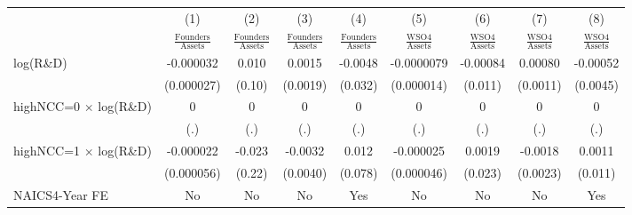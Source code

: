 {
\def\sym#1{\ifmmode^{#1}\else\(^{#1}\)\fi}
\begin{tabular}{l*{8}{c}}
\toprule
                    &\multicolumn{1}{c}{(1)}&\multicolumn{1}{c}{(2)}&\multicolumn{1}{c}{(3)}&\multicolumn{1}{c}{(4)}&\multicolumn{1}{c}{(5)}&\multicolumn{1}{c}{(6)}&\multicolumn{1}{c}{(7)}&\multicolumn{1}{c}{(8)}\\
                    &\multicolumn{1}{c}{$\frac{\textrm{Founders}}{\textrm{Assets}}$}&\multicolumn{1}{c}{$\frac{\textrm{Founders}}{\textrm{Assets}}$}&\multicolumn{1}{c}{$\frac{\textrm{Founders}}{\textrm{Assets}}$}&\multicolumn{1}{c}{$\frac{\textrm{Founders}}{\textrm{Assets}}$}&\multicolumn{1}{c}{$\frac{\textrm{WSO4}}{\textrm{Assets}}$}&\multicolumn{1}{c}{$\frac{\textrm{WSO4}}{\textrm{Assets}}$}&\multicolumn{1}{c}{$\frac{\textrm{WSO4}}{\textrm{Assets}}$}&\multicolumn{1}{c}{$\frac{\textrm{WSO4}}{\textrm{Assets}}$}\\
\midrule
log(R\&D)           &   -0.000032         &       0.010         &      0.0015         &     -0.0048         &  -0.0000079         &    -0.00084         &     0.00080         &    -0.00052         \\
                    &  (0.000027)         &      (0.10)         &    (0.0019)         &     (0.032)         &  (0.000014)         &     (0.011)         &    (0.0011)         &    (0.0045)         \\
\addlinespace
highNCC=0 $\times$ log(R\&D)&           0         &           0         &           0         &           0         &           0         &           0         &           0         &           0         \\
                    &         (.)         &         (.)         &         (.)         &         (.)         &         (.)         &         (.)         &         (.)         &         (.)         \\
\addlinespace
highNCC=1 $\times$ log(R\&D)&   -0.000022         &      -0.023         &     -0.0032         &       0.012         &   -0.000025         &      0.0019         &     -0.0018         &      0.0011         \\
                    &  (0.000056)         &      (0.22)         &    (0.0040)         &     (0.078)         &  (0.000046)         &     (0.023)         &    (0.0023)         &     (0.011)         \\
\addlinespace
NAICS4-Year FE      &          No         &          No         &          No         &         Yes         &          No         &          No         &          No         &         Yes         \\

\end{tabular}}
